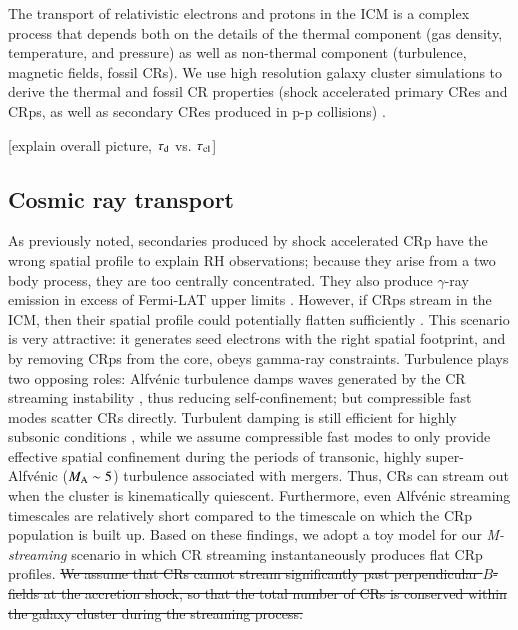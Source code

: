 \documentclass[a4paper,fleqn,usenatbib]{mnras}
\newcommand{\Mstream}{{\it M-streaming}\xspace}
\begin{document}
The transport of relativistic electrons and protons in
the ICM is a complex process that depends both on the details of the
thermal component (gas density, temperature, and pressure) as well as
non-thermal component (turbulence, magnetic fields, fossil CRs). We
use high resolution galaxy cluster simulations to derive the thermal
and fossil CR properties (shock accelerated primary CRes and CRps, as
well as secondary CRes produced in p-p collisions)
\citep{2007MNRAS.378..385P,pfrommer08,pinzke10,pinzke13}.

[explain overall picture, $\tau_{\mathrm{d}}$ vs. $\tau_{{\mathrm{cl}}}$]


\subsection{Cosmic ray transport}
As previously noted, secondaries produced by shock accelerated CRp
have the wrong spatial profile to explain RH observations; because
they arise from a two body process, they are too centrally
concentrated. They also produce $\gamma$-ray emission in excess of
Fermi-LAT upper limits
\citep{2012ApJ...757..123A,brunetti12,2014ApJ...787...18A}. However,
if CRps stream in the ICM, then their spatial profile could
potentially flatten sufficiently \citep{ensslin11,wiener13}. This
scenario is very attractive: it generates seed electrons with the
right spatial footprint, and by removing CRps from the core, obeys
gamma-ray constraints. Turbulence plays two opposing roles:
Alfv{\'e}nic turbulence damps waves generated by the CR streaming
instability \citep{yan02,farmer04}, thus reducing self-confinement;
but compressible fast modes scatter CRs directly. Turbulent damping is
still efficient for highly subsonic conditions \citep{wiener13}, while
we assume compressible fast modes to only provide effective spatial
confinement during the periods of transonic, highly super-Alfv{\'e}nic
($M_{\rm A} \sim 5$) turbulence associated with mergers. Thus, CRs can
stream out when the cluster is kinematically quiescent. Furthermore,
even Alfv{\'e}nic streaming timescales are relatively short
\cite[$\sim 0.1-0.5$ Gyr;][]{wiener13} compared to the timescale on
which the CRp population is built up. Based on these findings, we
adopt a toy model for our \Mstream scenario in which CR streaming
instantaneously produces flat CRp profiles. \sout{We assume that CRs cannot
stream significantly past perpendicular $B$-fields at the accretion
shock, so that the total number of CRs is conserved within the galaxy
cluster during the streaming process.}
\end{document}
